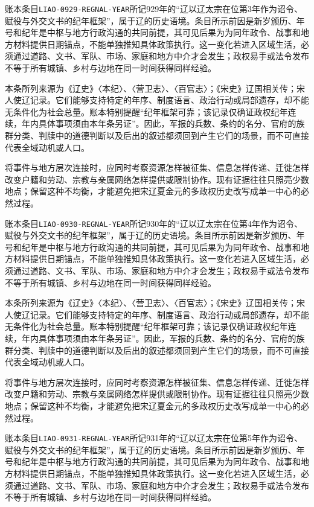 账本条目\texttt{LIAO-0929-REGNAL-YEAR}所记929年的“辽以辽太宗在位第3年作为诏令、赋役与外交文书的纪年框架”，属于辽的历史语境。条目所示前因是新岁颁历、年号和纪年是中枢与地方行政沟通的共同前提，其可见后果为为同年政令、战事和地方材料提供日期锚点，不能单独推知具体政策执行。这一变化若进入区域生活，必须通过道路、文书、军队、市场、家庭和地方中介才会发生；政权易手或法令发布不等于所有城镇、乡村与边地在同一时间获得同样经验。

本条所列来源为《辽史》〈本纪〉、〈营卫志〉、〈百官志〉；《宋史》辽国相关传；宋人使辽记录。它们能够支持特定的年序、制度语言、政治行动或局部遗存，却不能无条件化为社会总量。账本特别提醒“纪年框架可靠；该记录仅确证政权纪年连续，年内具体事项须由本年条另证”。因此，军报的兵数、条约的名分、官府的族群分类、判牍中的道德判断以及后出的叙述都须回到产生它们的场景，而不可直接代表全域动机或人口。

将事件与地方层次连接时，应同时考察资源怎样被征集、信息怎样传递、迁徙怎样改变户籍和劳动、宗教与亲属网络怎样提供或限制协作。现有证据往往只照亮少数地点；保留这种不均衡，才能避免把宋辽夏金元的多政权历史改写成单一中心的必然过程。

账本条目\texttt{LIAO-0930-REGNAL-YEAR}所记930年的“辽以辽太宗在位第4年作为诏令、赋役与外交文书的纪年框架”，属于辽的历史语境。条目所示前因是新岁颁历、年号和纪年是中枢与地方行政沟通的共同前提，其可见后果为为同年政令、战事和地方材料提供日期锚点，不能单独推知具体政策执行。这一变化若进入区域生活，必须通过道路、文书、军队、市场、家庭和地方中介才会发生；政权易手或法令发布不等于所有城镇、乡村与边地在同一时间获得同样经验。

本条所列来源为《辽史》〈本纪〉、〈营卫志〉、〈百官志〉；《宋史》辽国相关传；宋人使辽记录。它们能够支持特定的年序、制度语言、政治行动或局部遗存，却不能无条件化为社会总量。账本特别提醒“纪年框架可靠；该记录仅确证政权纪年连续，年内具体事项须由本年条另证”。因此，军报的兵数、条约的名分、官府的族群分类、判牍中的道德判断以及后出的叙述都须回到产生它们的场景，而不可直接代表全域动机或人口。

将事件与地方层次连接时，应同时考察资源怎样被征集、信息怎样传递、迁徙怎样改变户籍和劳动、宗教与亲属网络怎样提供或限制协作。现有证据往往只照亮少数地点；保留这种不均衡，才能避免把宋辽夏金元的多政权历史改写成单一中心的必然过程。

账本条目\texttt{LIAO-0931-REGNAL-YEAR}所记931年的“辽以辽太宗在位第5年作为诏令、赋役与外交文书的纪年框架”，属于辽的历史语境。条目所示前因是新岁颁历、年号和纪年是中枢与地方行政沟通的共同前提，其可见后果为为同年政令、战事和地方材料提供日期锚点，不能单独推知具体政策执行。这一变化若进入区域生活，必须通过道路、文书、军队、市场、家庭和地方中介才会发生；政权易手或法令发布不等于所有城镇、乡村与边地在同一时间获得同样经验。

